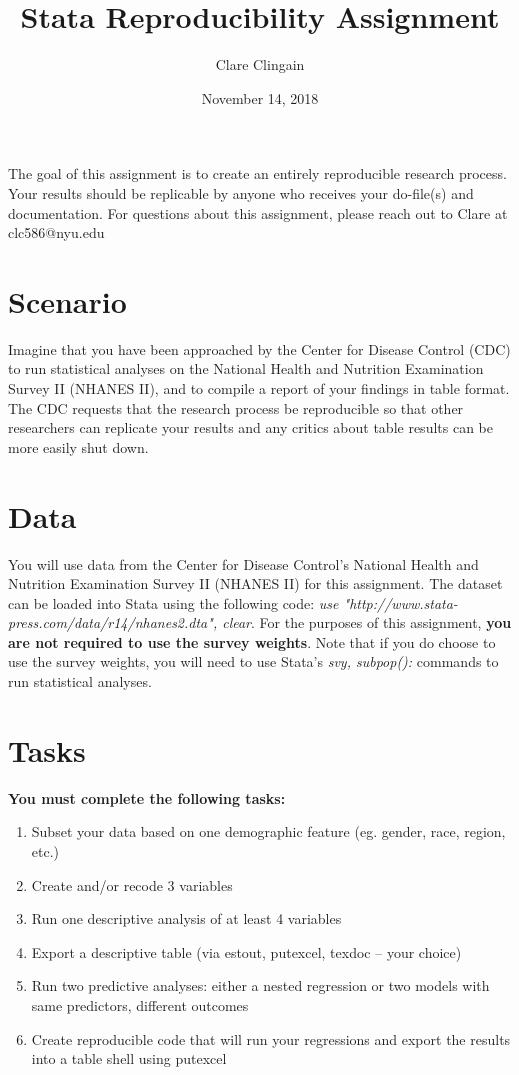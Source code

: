 \documentclass{article}
\title{Stata Reproducibility Assignment}
\author{Clare Clingain}
\date{November 14, 2018}
\begin{document}
\maketitle

The goal of this assignment is to create an entirely reproducible research process. Your results should be replicable by anyone who receives your do-file(s) and documentation. For questions about this assignment, please reach out to Clare at {\color{blue}clc586@nyu.edu}

\section{Scenario}
Imagine that you have been approached by the Center for Disease Control (CDC) to run statistical analyses on the National Health and Nutrition Examination Survey II (NHANES II), and to compile a report of your findings in table format. The CDC requests that the research process be reproducible so that other researchers can replicate your results and any critics about table results can be more easily shut down. 

\section{Data}
You will use data from the Center for Disease Control's National Health and Nutrition Examination Survey II (NHANES II) for this assignment. The dataset can be loaded into Stata using the following code: \textit{use "http://www.stata-press.com/data/r14/nhanes2.dta", clear}. For the purposes of this assignment, \textbf{you are not required to use the survey weights}. Note that if you do choose to use the survey weights, you will need to use Stata's \textit{svy, subpop():} commands to run statistical analyses. 

\section{Tasks}
\textbf{ You must complete the following tasks:}

\begin{enumerate}
\item Subset your data based on one demographic feature (eg. gender, race, region, etc.) 
\item Create and/or recode 3 variables
\item Run one descriptive analysis of at least 4 variables
\item Export a descriptive table (via estout, putexcel, texdoc -- your choice)
\item Run two predictive analyses: either a nested regression or two models with same predictors, different outcomes
\item Create reproducible code that will run your regressions and export the results into a table shell using putexcel
\end{enumerate}
\end{document}
